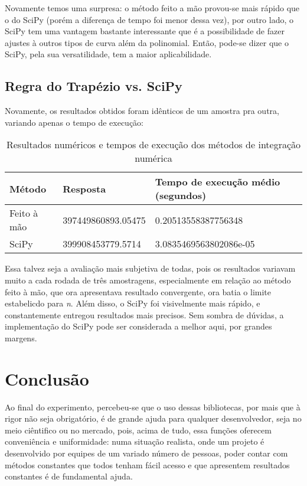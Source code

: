 \documentclass[12pt,A4]{report}
\begin{document}
Novamente temos uma surpresa: o método feito a mão provou-se mais rápido que o do SciPy (porém a diferença de tempo foi menor dessa vez), por outro lado, o SciPy tem uma vantagem bastante interessante que é a possibilidade de fazer ajustes à outros tipos de curva além da polinomial. Então, pode-se dizer que o SciPy, pela sua versatilidade, tem a maior aplicabilidade.

\subsection{Regra do Trapézio vs. SciPy}
Novamente, os resultados obtidos foram idênticos de um amostra pra outra, variando apenas o tempo de execução:

\begin{table}[htp]
\centering
\begin{tabular}{lll}
Método      & Resposta             & Tempo de execução médio (segundos) \\
\hline\hline
Feito à mão & 397449860893.05475 & 0.20513558387756348         \\
SciPy       & 399908453779.5714 & 3.0835469563802086e-05   
\end{tabular}
\caption{Resultados numéricos e tempos de execução dos métodos de integração numérica}
\end{table}
Essa talvez seja a avaliação mais subjetiva de todas, pois os resultados variavam muito a cada rodada de três amostragens, especialmente em relação ao método feito à mão, que ora apresentava resultado convergente, ora batia o limite estabelicdo para \textit{n}. Além disso, o SciPy foi visivelmente mais rápido, e constantemente entregou resultados mais precisos. Sem sombra de dúvidas, a implementação do SciPy pode ser considerada a melhor aqui, por grandes margens.

\section{Conclusão}
Ao final do experimento, percebeu-se que o uso dessas bibliotecas, por mais que à rigor não seja obrigatório, é de grande ajuda para qualquer desenvolvedor, seja no meio ciêntifico ou no mercado, pois, acima de tudo, essa funções oferecem conveniência e uniformidade: numa situação realista, onde um projeto é desenvolvido por equipes de um variado número de pessoas, poder contar com métodos constantes que todos tenham fácil acesso e que apresentem resultados constantes é de fundamental ajuda.
\end{document}
